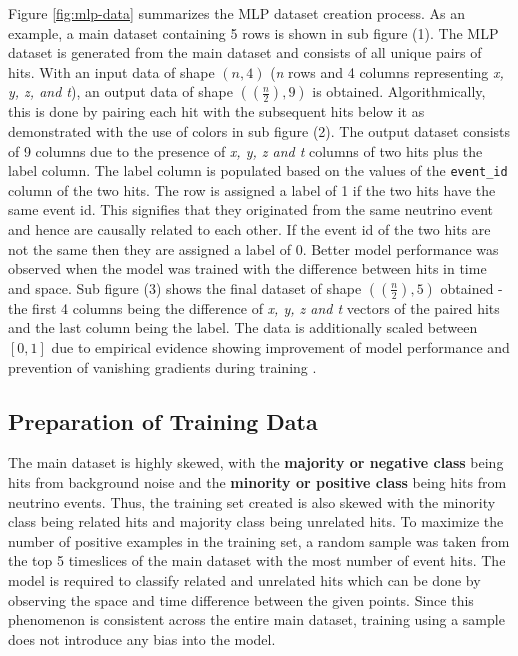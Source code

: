 Figure \ref{fig:mlp-data} summarizes the MLP dataset creation process.
As an example, a main dataset containing 5 rows is shown in sub figure
(1). The MLP dataset is generated from the main dataset and consists
of all unique pairs of hits. With an input data of shape $(n, 4)$
(\emph{n} rows and 4 columns representing \emph{x, y, z, and t}), an
output data of shape $((\frac{n}{2}), 9)$ is obtained.
Algorithmically, this is done by pairing each hit with the subsequent
hits below it as demonstrated with the use of colors in sub figure
(2). The output dataset consists of 9 columns due to the presence of
\emph{x, y, z and t} columns of two hits plus the label column. The
label column is populated based on the values of the
\texttt{event\_id} column of the two hits. The row is assigned a label
of 1 if the two hits have the same event id. This signifies that they
originated from the same neutrino event and hence are causally related
to each other. If the event id of the two hits are not the same then
they are assigned a label of 0. Better model performance was observed
when the model was trained with the difference between hits in time
and space. Sub figure (3) shows the final dataset of shape
$((\frac{n}{2}), 5)$ obtained - the first 4 columns being the
difference of \emph{x, y, z and t} vectors of the paired hits and the
last column being the label. The data is additionally scaled between
$[0,1]$ due to empirical evidence showing improvement of model
performance and prevention of vanishing gradients during training
\cite{bengio2012practical, goodfellow2016deep}.

\subsection{Preparation of Training Data}
\label{sec:mlp-data-prep-train}

The main dataset is highly skewed, with the \textbf{majority or
  negative class} being hits from background noise and the
\textbf{minority or positive class} being hits from neutrino events.
Thus, the training set created is also skewed with the minority class
being related hits and majority class being unrelated hits. To
maximize the number of positive examples in the training set, a random
sample was taken from the top 5 timeslices of the main dataset with
the most number of event hits. The model is required to classify
related and unrelated hits which can be done by observing the space
and time difference between the given points. Since this phenomenon is
consistent across the entire main dataset, training using a sample
does not introduce any bias into the model.

